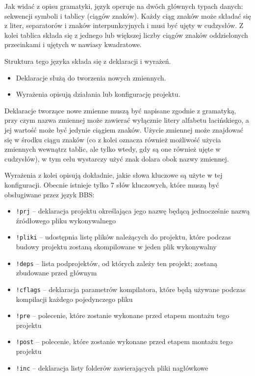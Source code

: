 Jak widać z opisu gramatyki, język operuje na dwóch głównych typach danych: sekwencji symboli i tablicy (ciągów znaków). Każdy ciąg znaków może składać się z liter, separatorów i znaków interpunkcyjnych i musi być ujęty w cudzysłów. Z kolei tablica składa się z jednego lub większej liczby ciągów znaków oddzielonych przecinkami i ujętych w nawiasy kwadratowe.

Struktura tego języka składa się z deklaracji i wyrażeń.
\begin{itemize}
    \item Deklaracje służą do tworzenia nowych zmiennych.
    \item Wyrażenia opisują działania lub konfigurację projektu.
\end{itemize}

Deklaracje tworzące nowe zmienne muszą być napisane zgodnie z gramatyką, przy czym nazwa zmiennej może zawierać wyłącznie litery alfabetu łacińskiego, a jej wartość może być jedynie ciągiem znaków. Użycie zmiennej może znajdować się w środku ciągu znaków (co z kolei oznacza również możliwość użycia zmiennych wewnątrz tablic, ale tylko wtedy, gdy są one również ujęte w cudzysłów), w tym celu wystarczy użyć znak dolara obok nazwy zmiennej.

Wyrażenia z kolei opisują dokładnie, jakie słowa kluczowe są użyte w tej konfiguracji. Obecnie istnieje tylko 7 słów kluczowych, które muszą być obsługiwane przez język BBS:
\begin{itemize}
    \item \texttt{!prj} -- deklaracja projektu określająca jego nazwę będącą jednocześnie nazwą źródłowego pliku wykonywalnego
    \item \texttt{!pliki} -- udostępnia listę plików należących do projektu, które podczas budowy projektu zostaną skompilowane w jeden plik wykonywalny
    \item \texttt{!deps} -- lista podprojektów, od których zależy ten projekt; zostaną zbudowane przed głównym
    \item \texttt{!cflags} -- deklaracja parametrów kompilatora, które będą używane podczas kompilacji każdego pojedynczego pliku
    \item \texttt{!pre} -- polecenie, które zostanie wykonane przed etapem montażu tego projektu
    \item \texttt{!post} -- polecenie, które zostanie wykonane przed etapem montażu tego projektu
    \item \texttt{!inc} -- deklaracja listy folderów zawierających pliki nagłówkowe
\end{itemize}

